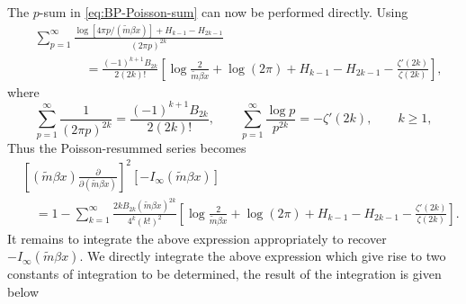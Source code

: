 \documentclass[a4paper,11pt]{article}
\begin{document}
The $p$-sum in \eqref{eq:BP-Poisson-sum} can now be performed directly.  Using
\begin{align}
&	\sum_{p=1}^{\infty}
	\frac{
		\log[4\pi p/(\tilde m\beta x)]
		+H_{k-1}-H_{2k-1}}
	{(2\pi p)^{2k}}\nonumber\\
&\qquad\qquad	=
	\frac{(-1)^{k+1}B_{2k}}{2(2k)!}
	\left[
	\log\!\frac{2}{\tilde m\beta x}
	+\log(2\pi)
	+H_{k-1}-H_{2k-1}
	-\frac{\zeta'(2k)}{\zeta(2k)}
	\right],
	\label{eq:BP-p-sum}
\end{align}
where
\begin{equation}
	\sum_{p=1}^{\infty}\frac{1}{(2\pi p)^{2k}}
	=
	\frac{(-1)^{k+1}B_{2k}}{2(2k)!},
	\qquad
	\sum_{p=1}^{\infty}\frac{\log p}{p^{2k}}
	=
	-\zeta'(2k),
	\qquad k\geq1,
\end{equation}
Thus the Poisson-resummed series becomes
\begin{align}
	&\left[
	(\tilde m\beta x)
	\frac{\partial}{\partial(\tilde m\beta x)}
	\right]^2
	[-I_\infty(\tilde m\beta x)]
	\nonumber\\
	&\quad=
	1-\sum_{k=1}^{\infty}
	\frac{2kB_{2k}(\tilde m\beta x)^{2k}}
	{4^k(k!)^2}
	\left[
	\log\!\frac{2}{\tilde m\beta x}
	+\log(2\pi)
	+H_{k-1}-H_{2k-1}
	-\frac{\zeta'(2k)}{\zeta(2k)}
	\right].
	\label{eq:BP-differential-series}
\end{align}
It remains to integrate the above expression appropriately to recover $-I_\infty(\tilde m \beta x)$. We directly integrate the above expression which give rise to two constants of integration to be determined, the result of the integration is given below
\end{document}
